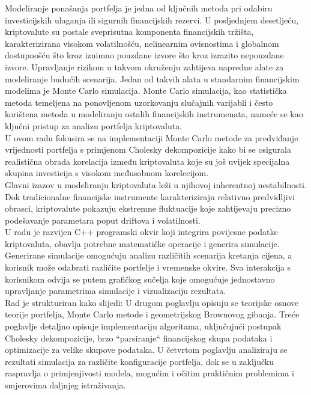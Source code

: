 \documentclass[zavrsnirad]{fer}
\begin{document}
Modeliranje ponašanja portfelja je jedna od ključnih metoda pri odabiru
investicijskih ulaganja ili sigurnih financijskih rezervi.
U posljednjem desetljeću, kriptovalute su postale sveprisutna
komponenta financijskih tržišta, karakterizirana visokom volatilnošću,
nelinearnim ovisnostima i globalnom dostupnošću što kroz iznimno pouzdane izvore
što kroz izrazito nepouzdane izvore.
Upravljanje rizikom u takvom okruženju zahtijeva napredne alate za
modeliranje budućih scenarija.
Jedan od takvih alata u standarnim financijskim modelima je Monte Carlo
simulacija.
Monte Carlo simulacija, kao statistička metoda temeljena na ponovljenom
uzorkovanju slučajnih varijabli i često korištena metoda u modeliranju
ostalih financijskih instrumenata, nameće se kao ključni pristup za
analizu portfelja kriptovaluta.\\
U ovom radu fokusira se na implementaciji
Monte Carlo metode za predviđanje vrijednosti portfelja s primjenom
Cholesky dekompozicije kako bi se osigurala realistična obrada
korelacija između kriptovaluta koje su još uvijek specijalna skupina investicija
s visokom međusobnom korelecijom.\\
Glavni izazov u modeliranju kriptovaluta leži u njihovoj inherentnoj
nestabilnosti. Dok tradicionalne financijske instrumente karakteriziraju
relativno predvidljivi obrasci, kriptovalute pokazuju ekstremne fluktuacije
koje zahtijevaju precizno podešavanje parametara poput driftova i
volatilnosti.\\
U radu je razvijen C++ programski okvir koji integrira povijesne podatke
kriptovaluta, obavlja potrebne matematičke operacije i generira simulacije.
Generirane simulacije omogućuju analizu različitih scenarija kretanja cijena,
a korisnik može odabrati različite portfelje i vremenske okvire.
Sva interakcija s korisnikom odvija se putem grafičkog sučelja koje
omogućuje jednostavno upravljanje parametrima simulacije i vizualizaciju
rezultata.\\
Rad je strukturiran kako slijedi: U drugom poglavlju opisuju se teorijske
osnove teorije portfelja, Monte Carlo metode i geometrijskog Brownovog gibanja.
Treće poglavlje detaljno opisuje implementaciju algoritama, uključujući
postupak Cholesky dekompozicije, brzo ``parsiranje`` financijskog skupa podataka
i optimizacije za velike skupove podataka.
U četvrtom poglavlju analiziraju se rezultati simulacija za različite
konfiguracije portfelja, dok se u zaključku raspravlja o primjenjivosti
modela, mogućim i očitim praktičnim problemima i smjerovima daljnjeg istraživanja.
\end{document}
